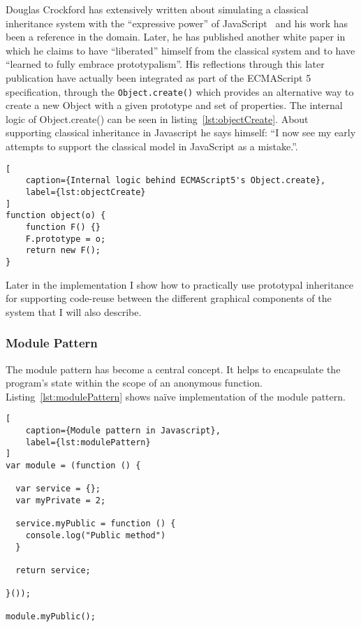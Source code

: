 Douglas Crockford has extensively written about simulating a classical inheritance system with the ``expressive power'' of JavaScript~\cite{crockford_inheritance} and his work has been a reference in the domain. Later, he has published another white paper in which he claims to have ``liberated'' himself from the classical system and to have ``learned to fully embrace prototypalism''\cite{crockford_prototypal}. His reflections through this later publication have actually been integrated as part of the ECMAScript 5 specification, through the \texttt{Object.create()} which provides an alternative way to create a new Object with a given prototype and set of properties. The internal logic of Object.create() can be seen in listing~\ref{lst:objectCreate}. About supporting classical inheritance in Javascript he says himself: ``I now see my early attempts to support the classical model in JavaScript as a mistake.''.

\begin{lstlisting}[
    caption={Internal logic behind ECMAScript5's Object.create},
    label={lst:objectCreate}
]
function object(o) {
    function F() {}
    F.prototype = o;
    return new F();
}
\end{lstlisting}

Later in the implementation I show how to practically use prototypal inheritance for supporting code-reuse between the different graphical components of the system that I will also describe.

\subsubsection{Module Pattern}

The module pattern\cite{Miraglia2007} has become a central concept. It helps to encapsulate the program's state within the scope of an anonymous function. Listing~\ref{lst:modulePattern} shows naïve implementation of the module pattern.

\begin{lstlisting}[
    caption={Module pattern in Javascript},
    label={lst:modulePattern}
]
var module = (function () {

  var service = {};
  var myPrivate = 2;
  
  service.myPublic = function () {
    console.log("Public method")
  } 

  return service;

}());

module.myPublic();
\end{lstlisting}


